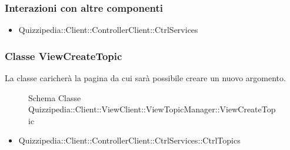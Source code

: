 \subsubsection{Interazioni con altre componenti}
\begin{itemize}
\item Quizzipedia::Client::ControllerClient::CtrlServices
\end{itemize}
\subsubsection{Classe ViewCreateTopic}
La classe caricherà la pagina da cui sarà possibile creare un nuovo argomento.
\begin{figure}[H]
\centering
\noindent{}
\caption{Schema Classe Quizzipedia::Client::ViewClient::ViewTopicManager::ViewCreateTopic}
\end{figure}
\begin{itemize}
\item Quizzipedia::Client::ControllerClient::CtrlServices::CtrlTopics
\end{itemize}
